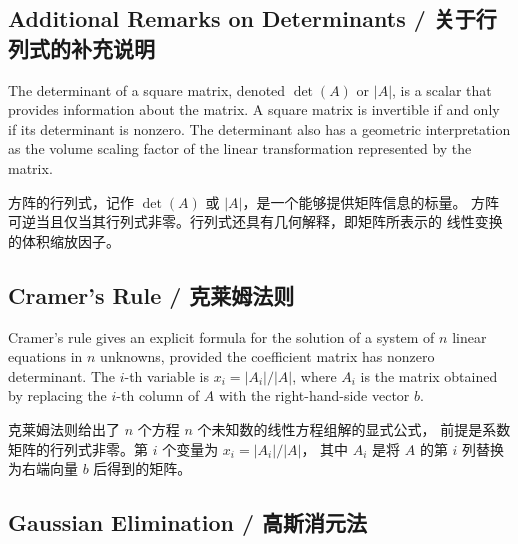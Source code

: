 \subsection{Additional Remarks on Determinants / 关于行列式的补充说明}

\begin{original}
The determinant of a square matrix, denoted $\det(A)$ or $|A|$, is a
scalar that provides information about the matrix.  A square matrix is
invertible if and only if its determinant is nonzero.  The determinant
also has a geometric interpretation as the volume scaling factor of the
linear transformation represented by the matrix.
\end{original}
\begin{translation}
方阵的行列式，记作 $\det(A)$ 或 $|A|$，是一个能够提供矩阵信息的标量。
方阵可逆当且仅当其行列式非零。行列式还具有几何解释，即矩阵所表示的
线性变换的体积缩放因子。
\end{translation}

\subsection{Cramer's Rule / 克莱姆法则}

\begin{original}
Cramer's rule gives an explicit formula for the solution of a system of
$n$ linear equations in $n$ unknowns, provided the coefficient matrix
has nonzero determinant.  The $i$-th variable is $x_i = |A_i|/|A|$,
where $A_i$ is the matrix obtained by replacing the $i$-th column of
$A$ with the right-hand-side vector $b$.
\end{original}
\begin{translation}
克莱姆法则给出了 $n$ 个方程 $n$ 个未知数的线性方程组解的显式公式，
前提是系数矩阵的行列式非零。第 $i$ 个变量为 $x_i = |A_i|/|A|$，
其中 $A_i$ 是将 $A$ 的第 $i$ 列替换为右端向量 $b$ 后得到的矩阵。
\end{translation}

\subsection{Gaussian Elimination / 高斯消元法}

